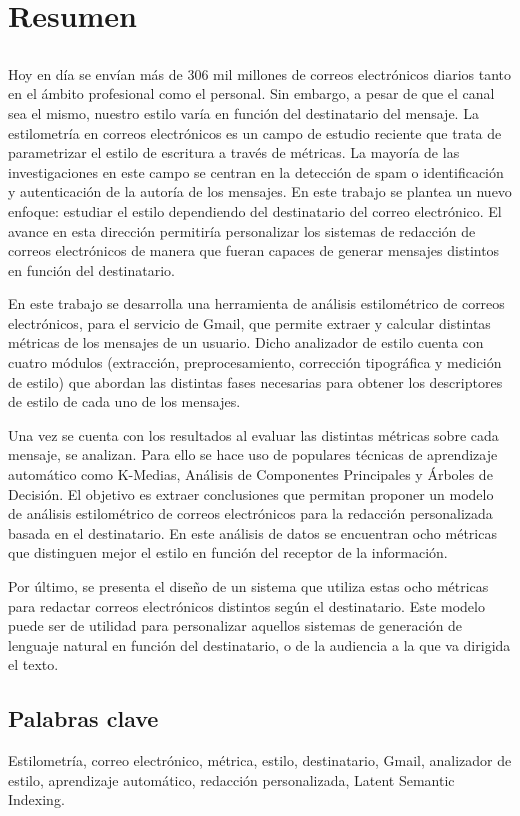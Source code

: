 \chapter*{Resumen}

\section*{\tituloPortadaVal}

Hoy en día se envían más de 306 mil millones de correos electrónicos diarios tanto en el ámbito profesional como el personal. Sin embargo, a pesar de que el canal sea el mismo, nuestro estilo varía en función del destinatario del mensaje. La estilometría en correos electrónicos es un campo de estudio reciente que trata de parametrizar el estilo de escritura a través de métricas. La mayoría de las investigaciones en este campo se centran en la detección de spam o identificación y autenticación de la autoría de los mensajes. En este trabajo se plantea un nuevo enfoque: estudiar el estilo dependiendo del destinatario del correo electrónico. El avance en esta dirección permitiría personalizar los sistemas de redacción de correos electrónicos de manera que fueran capaces de generar mensajes distintos en función del destinatario.

En este trabajo se desarrolla una herramienta de análisis estilométrico de correos electrónicos, para el servicio de Gmail, que permite extraer y calcular distintas métricas de los mensajes de un usuario. Dicho analizador de estilo cuenta con cuatro módulos (extracción, preprocesamiento, corrección tipográfica y medición de estilo) que abordan las distintas fases necesarias para obtener los descriptores de estilo de cada uno de los mensajes.

Una vez se cuenta con los resultados al evaluar las distintas métricas sobre cada mensaje, se analizan. Para ello se hace uso de populares técnicas de aprendizaje automático como K-Medias, Análisis de Componentes Principales y Árboles de Decisión. El objetivo es extraer conclusiones que permitan proponer un modelo de análisis estilométrico de correos electrónicos para la redacción personalizada basada en el destinatario. En este análisis de datos se encuentran ocho métricas que distinguen mejor el estilo en función del receptor de la información.

Por último, se presenta el diseño de un sistema que utiliza estas ocho métricas para redactar correos electrónicos distintos según el destinatario. Este modelo puede ser de utilidad para personalizar aquellos sistemas de generación de lenguaje natural en función del destinatario, o de la audiencia a la que va dirigida el texto.

\section*{Palabras clave}
   
\noindent Estilometría, correo electrónico, métrica, estilo, destinatario, Gmail, analizador de estilo, aprendizaje automático, redacción personalizada, Latent Semantic Indexing.

   


